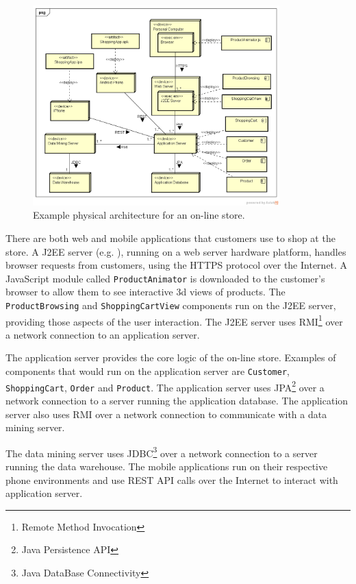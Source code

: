\begin{figure}[h!]
    \centering
    \includegraphics[trim=39 42 25 45,clip,width=0.85\textwidth]{images/uml/deployment_diagram.png}
    \caption{Example physical architecture for an on-line store.}
    \label{fig:deploymentDiagram}
\end{figure}

\noindent
There are both web and mobile applications that customers use to shop at the store.
A J2EE server (e.g. ), running on a web server hardware platform,
handles browser requests from customers, using the HTTPS protocol over the Internet.
A JavaScript module called \texttt{ProductAnimator} is downloaded to the customer's browser to allow them to see interactive 3d views of products.
The \texttt{ProductBrowsing} and \texttt{ShoppingCartView} components run on the J2EE server, providing those aspects of the user interaction.
The J2EE server uses RMI\footnote{Remote Method Invocation} over a network connection to an application server.

The application server provides the core logic of the on-line store.
Examples of components that would run on the application server are \texttt{Customer}, \texttt{ShoppingCart}, \texttt{Order} and \texttt{Product}.
The application server uses JPA\footnote{Java Persistence API} over a network connection to a server running the application database.
The application server also uses RMI over a network connection to communicate with a data mining server.

The data mining server uses JDBC\footnote{Java DataBase Connectivity} over a network connection to a server running the data warehouse.
The mobile applications run on their respective phone environments and use REST API calls over the Internet to interact with application server.

